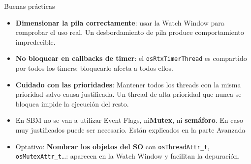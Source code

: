 \begin{frame}{Buenas prácticas}
    \begin{itemize}
        \item \textbf{Dimensionar la pila correctamente}: usar la Watch Window para comprobar el uso real. Un desbordamiento de pila  produce comportamiento impredecible.
        \item \textbf{No bloquear en callbacks de timer}: el \texttt{osRtxTimerThread} es compartido por todos los timers; bloquearlo afecta a todos ellos.
        \item \textbf{Cuidado con las prioridades}: Mantener todos los threads con la misma prioridad salvo causa justificada. Un thread de alta prioridad que nunca se bloquea impide la ejecución del resto. 
        \item En SBM no se van a utilizar Event Flags, ni\textbf{Mutex}, ni \textbf{semáforo}. En caso muy justificados puede ser necesario. Están explicados en la parte Avanzada
        \item Optativo: \textbf{Nombrar los objetos del SO} con \texttt{osThreadAttr\_t},             \texttt{osMutexAttr\_t}\ldots: aparecen en la Watch Window y facilitan la depuración.
    \end{itemize}
\end{frame}

